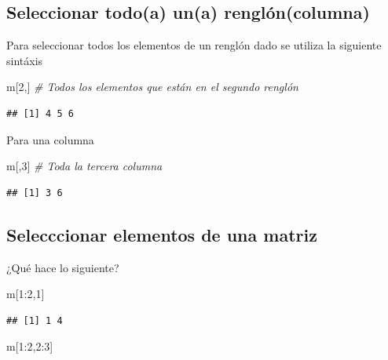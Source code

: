 \documentclass[
]{book}
\newenvironment{Shaded}{\begin{snugshade}}{\end{snugshade}}
\newcommand{\CommentTok}[1]{\textcolor[rgb]{0.56,0.35,0.01}{\textit{#1}}}
\newcommand{\DecValTok}[1]{\textcolor[rgb]{0.00,0.00,0.81}{#1}}
\newcommand{\NormalTok}[1]{#1}
\newcommand{\SpecialCharTok}[1]{\textcolor[rgb]{0.00,0.00,0.00}{#1}}
\begin{document}
\hypertarget{seleccionar-todoa-una-rengluxf3ncolumna}{%
\subsection{Seleccionar todo(a) un(a) renglón(columna)}\label{seleccionar-todoa-una-rengluxf3ncolumna}}

Para seleccionar todos los elementos de un renglón dado se utiliza la
siguiente sintáxis

\begin{Shaded}
\begin{Highlighting}[]
\NormalTok{m[}\DecValTok{2}\NormalTok{,]  }\CommentTok{\# Todos los elementos que están en el segundo renglón}
\end{Highlighting}
\end{Shaded}

\begin{verbatim}
## [1] 4 5 6
\end{verbatim}

Para una columna

\begin{Shaded}
\begin{Highlighting}[]
\NormalTok{m[,}\DecValTok{3}\NormalTok{] }\CommentTok{\# Toda la tercera columna}
\end{Highlighting}
\end{Shaded}

\begin{verbatim}
## [1] 3 6
\end{verbatim}

\hypertarget{selecccionar-elementos-de-una-matriz}{%
\subsection{Selecccionar elementos de una matriz}\label{selecccionar-elementos-de-una-matriz}}

¿Qué hace lo siguiente?

\begin{Shaded}
\begin{Highlighting}[]
\NormalTok{m[}\DecValTok{1}\SpecialCharTok{:}\DecValTok{2}\NormalTok{,}\DecValTok{1}\NormalTok{]}
\end{Highlighting}
\end{Shaded}

\begin{verbatim}
## [1] 1 4
\end{verbatim}

\begin{Shaded}
\begin{Highlighting}[]
\NormalTok{m[}\DecValTok{1}\SpecialCharTok{:}\DecValTok{2}\NormalTok{,}\DecValTok{2}\SpecialCharTok{:}\DecValTok{3}\NormalTok{]}
\end{Highlighting}
\end{Shaded}
\end{document}
